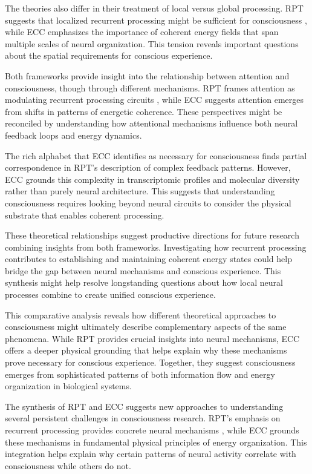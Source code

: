 \begin{refsection}
The theories also differ in their treatment of local versus global processing. RPT suggests that localized recurrent processing might be sufficient for consciousness \cite{Super2001}, while ECC emphasizes the importance of coherent energy fields that span multiple scales of neural organization. This tension reveals important questions about the spatial requirements for conscious experience.

Both frameworks provide insight into the relationship between attention and consciousness, though through different mechanisms. RPT frames attention as modulating recurrent processing circuits \cite{Block2007}, while ECC suggests attention emerges from shifts in patterns of energetic coherence. These perspectives might be reconciled by understanding how attentional mechanisms influence both neural feedback loops and energy dynamics.

The rich alphabet that ECC identifies as necessary for consciousness finds partial correspondence in RPT's description of complex feedback patterns. However, ECC grounds this complexity in transcriptomic profiles and molecular diversity rather than purely neural architecture. This suggests that understanding consciousness requires looking beyond neural circuits to consider the physical substrate that enables coherent processing.

These theoretical relationships suggest productive directions for future research combining insights from both frameworks. Investigating how recurrent processing contributes to establishing and maintaining coherent energy states could help bridge the gap between neural mechanisms and conscious experience. This synthesis might help resolve longstanding questions about how local neural processes combine to create unified conscious experience.

This comparative analysis reveals how different theoretical approaches to consciousness might ultimately describe complementary aspects of the same phenomena. While RPT provides crucial insights into neural mechanisms, ECC offers a deeper physical grounding that helps explain why these mechanisms prove necessary for conscious experience. Together, they suggest consciousness emerges from sophisticated patterns of both information flow and energy organization in biological systems.

The synthesis of RPT and ECC suggests new approaches to understanding several persistent challenges in consciousness research. RPT's emphasis on recurrent processing provides concrete neural mechanisms \cite{Lamme2000}, while ECC grounds these mechanisms in fundamental physical principles of energy organization. This integration helps explain why certain patterns of neural activity correlate with consciousness while others do not.


\end{refsection}
